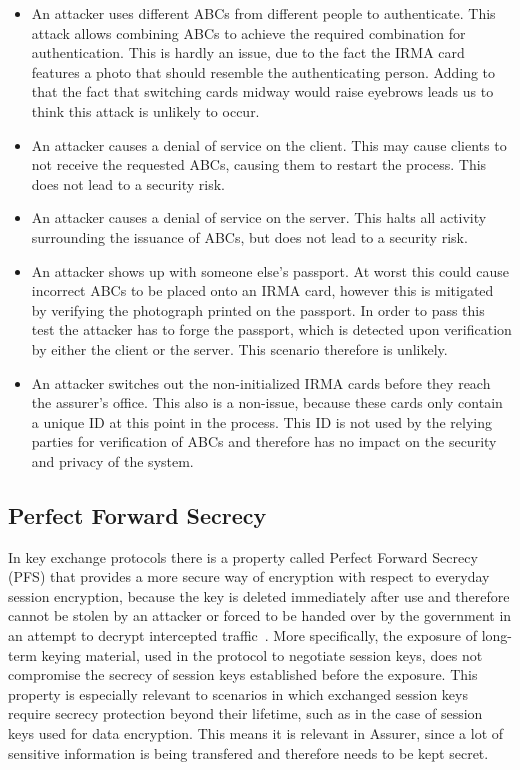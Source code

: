 \begin{itemize}
  \item An attacker uses different ABCs from different people to authenticate. This attack allows combining ABCs to achieve the required combination for authentication. This is hardly an issue, due to the fact the IRMA card features a photo that should resemble the authenticating person. Adding to that the fact that switching cards midway would raise eyebrows leads us to think this attack is unlikely to occur.
  \item An attacker causes a denial of service on the client. This may cause clients to not receive the requested ABCs, causing them to restart the process. This does not lead to a security risk.
  \item An attacker causes a denial of service on the server. This halts all activity surrounding the issuance of ABCs, but does not lead to a security risk.
  \item An attacker shows up with someone else's passport. At worst this could cause incorrect ABCs to be placed onto an IRMA card, however this is mitigated by verifying the photograph printed on the passport. In order to pass this test the attacker has to forge the passport, which is detected upon verification by either the client or the server. This scenario therefore is unlikely.
  \item An attacker switches out the non-initialized IRMA cards before they reach the assurer's office. This also is a non-issue, because these cards only contain a unique ID at this point in the process. This ID is not used by the relying parties for verification of ABCs and therefore has no impact on the security and privacy of the system.
\end{itemize}

\subsection{Perfect Forward Secrecy}
\label{subsubsec:pfs}
In key exchange protocols there is a property called Perfect Forward Secrecy (PFS) that provides a more secure way of encryption with respect to everyday session encryption, because the key is deleted immediately after use and therefore cannot be stolen by an attacker or forced to be handed over by the government in an attempt to decrypt intercepted traffic~\cite{lecture2}. More specifically, the exposure of long-term keying material, used in the protocol to negotiate session keys, does not compromise the secrecy of session keys established before the exposure. This property is especially relevant to scenarios in which exchanged session keys require secrecy protection beyond their lifetime, such as in the case of session keys used for data encryption. This means it is relevant in Assurer, since a lot of sensitive information is being transfered and therefore needs to be kept secret.

